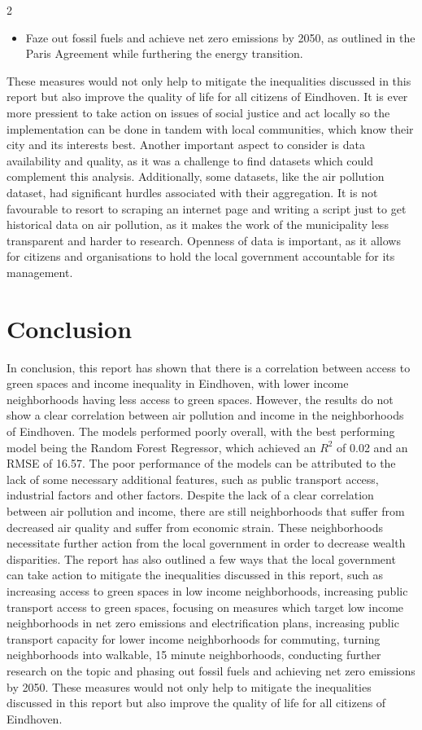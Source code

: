 \documentclass[12pt, a4paper]{article}
\begin{document}
\begin{multicols}{2}
\begin{itemize}
        \item Faze out fossil fuels and achieve net zero emissions by 2050, as outlined in the Paris Agreement \cite{unfccc2015paris} while furthering the energy transition.
    \end{itemize}
    These measures would not only help to mitigate the inequalities discussed in this report but also improve the quality of life for all citizens of Eindhoven. It is ever more pressient to take action on issues of social justice and act locally so the implementation can be done in tandem with local communities, which know their city and its interests best.
    Another important aspect to consider is data availability and quality, as it was a challenge to find datasets which could complement this analysis. Additionally, some datasets, like the air pollution dataset, had significant hurdles associated with their aggregation. It is not favourable to resort to scraping an internet page and writing a script just to get historical data on air pollution, as it makes the work of the municipality less transparent and harder to research. Openness of data is important, as it allows for citizens and organisations to hold the local government accountable for its management.
    \section{Conclusion}
    In conclusion, this report has shown that there is a correlation between access to green spaces and income inequality in Eindhoven, with lower income neighborhoods having less access to green spaces. However, the results do not show a clear correlation between air pollution and income in the neighborhoods of Eindhoven. The models performed poorly overall, with the best performing model being the Random Forest Regressor, which achieved an $R^2$ of 0.02 and an RMSE of 16.57. The poor performance of the models can be attributed to the lack of some necessary additional features, such as public transport access, industrial factors and other factors.
    Despite the lack of a clear correlation between air pollution and income, there are still neighborhoods that suffer from decreased air quality and suffer from economic strain. These neighborhoods necessitate further action from the local government in order to decrease wealth disparities.
    The report has also outlined a few ways that the local government can take action to mitigate the inequalities discussed in this report, such as increasing access to green spaces in low income neighborhoods, increasing public transport access to green spaces, focusing on measures which target low income neighborhoods in net zero emissions and electrification plans, increasing public transport capacity for lower income neighborhoods for commuting, turning neighborhoods into walkable, 15 minute neighborhoods, conducting further research on the topic and phasing out fossil fuels and achieving net zero emissions by 2050.
    These measures would not only help to mitigate the inequalities discussed in this report but also improve the quality of life for all citizens of Eindhoven. 


\end{multicols}
\end{document}
